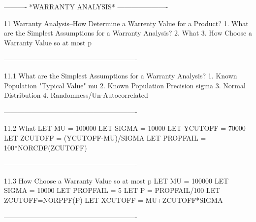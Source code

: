  
 
 
 
 
 
 
 
 
 
 
 
 
 
 
 
 
 
 
 
 
 
 
 
 
 
 
 
 
 
 
 
----------  *WARRANTY ANALYSIS*  ----------------------
 
11
Warranty Analysis--How Determine a Warrenty Value for a Product?
   1. What are the Simplest Assumptions for a Warranty Analysis?
   2. What %
   3. How Choose a Warranty Value so at most p%
 
----------------------------------------------------------
 
11.1
What are the Simplest Assumptions for a Warranty Analysis?
   1. Known Population "Typical Value" mu
   2. Known Population Precision sigma
   3. Normal Distribution
   4. Randomness/Un-Autocorrelated
 
----------------------------------------------------------
 
11.2
What %
      LET MU = 100000
      LET SIGMA = 10000
      LET YCUTOFF = 70000
      LET ZCUTOFF = (YCUTOFF-MU)/SIGMA
      LET PROPFAIL = 100*NORCDF(ZCUTOFF)
 
----------------------------------------------------------
 
11.3
How Choose a Warranty Value so at most p%
      LET MU = 100000
      LET SIGMA = 10000
      LET PROPFAIL = 5
      LET P = PROPFAIL/100
      LET ZCUTOFF=NORPPF(P)
      LET XCUTOFF = MU+ZCUTOFF*SIGMA
 
----------------------------------------------------------
 
 
 
 
 
 
 
 
 
 
 
 
 
 
 
 
 
 
 
